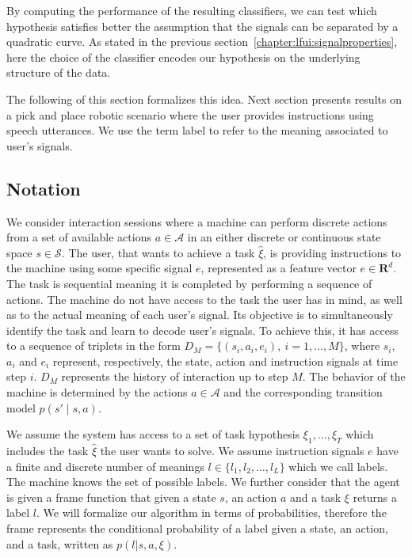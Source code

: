By computing the performance of the resulting classifiers, we can test which hypothesis satisfies better the assumption that the signals can be separated by a quadratic curve. As stated in the previous section~\ref{chapter:lfui:signalproperties}, here the choice of the classifier encodes our hypothesis on the underlying structure of the data.

The following of this section formalizes this idea. Next section presents results on a pick and place robotic scenario where the user provides instructions using speech utterances. We use the term label to refer to the meaning associated to user's signals.

\subsection{Notation}

We consider interaction sessions where a machine can perform discrete actions from a set of available actions $a \in \mathcal{A}$ in an either discrete or continuous state space $s \in \mathcal{S}$. The user, that wants to achieve a task $\hat{\xi}$, is providing instructions to the machine using some specific signal $e$, represented as a feature vector  $e \in \mathbf{R}^d$. The task is sequential meaning it is completed by performing a sequence of actions. The machine do not have access to the task the user has in mind, as well as to the actual meaning of each user's signal. Its objective is to simultaneously identify the task and learn to decode user's signals. To achieve this, it has access to a sequence of triplets in the form $D_M = \{(s_i, a_i, e_i),\ i = 1,\ldots,M\}$, where $s_i$, $a_i$ and $e_i$ represent, respectively, the state, action and instruction signals at time step $i$. $D_M$ represents the history of interaction up to step $M$. The behavior of the machine is determined by the actions $a\in\mathcal{A}$ and the corresponding transition model $p(s'\mid s,a)$.

We assume the system has access to a set of task hypothesis $\xi_1,\ldots,\xi_T$ which includes the task $\hat{\xi}$ the user wants to solve. We assume instruction signals $e$ have a finite and discrete number of meanings $l \in \{l_1, l_2, \ldots, l_L\}$ which we call labels. The machine knows the set of possible labels. We further consider that the agent is given a frame function that given a state $s$, an action $a$ and a task $\xi$ returns a label $l$. We will formalize our algorithm in terms of probabilities, therefore the frame represents the conditional probability of a label given a state, an action, and a task, written as $p(l | s, a, \xi)$.


